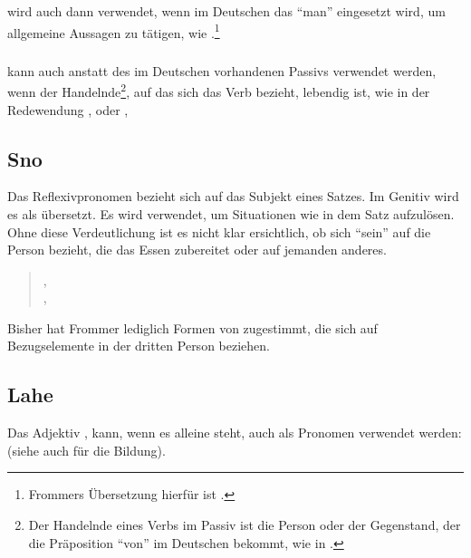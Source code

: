 \subsubsection{}  wird auch dann verwendet, wenn im Deutschen das "`man"'
eingesetzt wird, um allgemeine Aussagen zu t\"atigen, wie
.\footnote{Frommers
\"Ubersetzung hierf\"ur ist .}

\subsubsection{}  kann auch anstatt des im Deutschen vorhandenen Passivs
verwendet werden, wenn der Handelnde\footnote{Der Handelnde eines Verbs im Passiv ist
die Person oder der Gegenstand, der die Pr\"aposition "`von"' im Deutschen bekommt,
wie in .}, auf das sich das Verb bezieht,
lebendig ist, wie in der Redewendung ,
 oder , 
\label{syn:prn:fko}

\subsection{Sno} Das Reflexivpronomen  bezieht sich auf das Subjekt eines
Satzes. Im Genitiv wird es als  \"ubersetzt.
Es wird verwendet, um Situationen wie in dem Satz 
aufzul\"osen. Ohne diese Verdeutlichung ist es nicht klar ersichtlich, ob sich
"`sein"' auf die Person bezieht, die das Essen zubereitet oder auf jemanden anderes.

\begin{quotation}
\noindent{}, \\
\noindent{}, 
\end{quotation}

\noindent Bisher hat Frommer lediglich Formen von  zugestimmt, die sich
auf Bezugselemente in der dritten Person beziehen.

\subsection{Lahe} Das Adjektiv ,  kann, wenn
es alleine steht, auch als Pronomen verwendet werden:
 (siehe auch 
f\"ur die Bildung).

